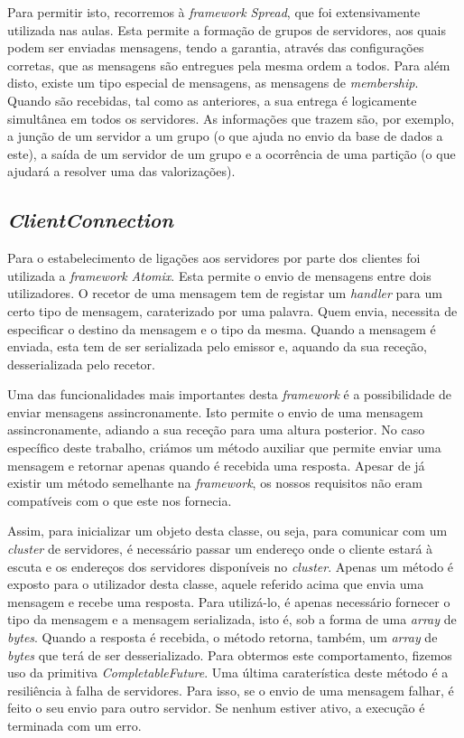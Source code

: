 \documentclass[a4paper]{report}
\begin{document}
{				Para permitir isto, recorremos à \textit{framework Spread}, que foi extensivamente utilizada nas aulas. Esta permite a formação de grupos de servidores, aos quais podem ser enviadas mensagens, tendo a garantia, através das configurações corretas, que as mensagens são entregues pela mesma ordem a todos. Para além disto, existe um tipo especial de mensagens, as mensagens de \textit{membership}. Quando são recebidas, tal como as anteriores, a sua entrega é logicamente simultânea em todos os servidores. As informações que trazem são, por exemplo, a junção de um servidor a um grupo (o que ajuda no envio da base de dados a este), a saída de um servidor de um grupo e a ocorrência de uma partição (o que ajudará a resolver uma das valorizações).

		\subsection{\textit{ClientConnection}} \label{subsec:ClientConnection}
			Para o estabelecimento de ligações aos servidores por parte dos clientes foi utilizada a \textit{framework Atomix}. Esta permite o envio de mensagens entre dois utilizadores. O recetor de uma mensagem tem de registar um \textit{handler} para um certo tipo de mensagem, caraterizado por uma palavra. Quem envia, necessita de especificar o destino da mensagem e o tipo da mesma. Quando a mensagem é enviada, esta tem de ser serializada pelo emissor e, aquando da sua receção, desserializada pelo recetor.
			
			Uma das funcionalidades mais importantes desta \textit{framework} é a possibilidade de enviar mensagens assincronamente. Isto permite o envio de uma mensagem assincronamente, adiando a sua receção para uma altura posterior. No caso específico deste trabalho, criámos um método auxiliar que permite enviar uma mensagem e retornar apenas quando é recebida uma resposta. Apesar de já existir um método semelhante na \textit{framework}, os nossos requisitos não eram compatíveis com o que este nos fornecia.
			
			Assim, para inicializar um objeto desta classe, ou seja, para comunicar com um \textit{cluster} de servidores, é necessário passar um endereço onde o cliente estará à escuta e os endereços dos servidores disponíveis no \textit{cluster}. Apenas um método é exposto para o utilizador desta classe, aquele referido acima que envia uma mensagem e recebe uma resposta. Para utilizá-lo, é apenas necessário fornecer o tipo da mensagem e a mensagem serializada, isto é, sob a forma de uma \textit{array} de \textit{bytes}. Quando a resposta é recebida, o método retorna, também, um \textit{array} de \textit{bytes} que terá de ser desserializado. Para obtermos este comportamento, fizemos uso da primitiva \textit{CompletableFuture}. Uma última caraterística deste método é a resiliência à falha de servidores. Para isso, se o envio de uma mensagem falhar, é feito o seu envio para outro servidor. Se nenhum estiver ativo, a execução é terminada com um erro.
	
}
\end{document}

